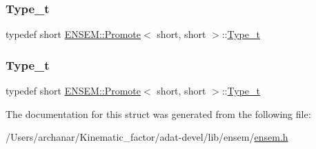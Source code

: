 \mbox{\label{structENSEM_1_1Promote_3_01short_00_01short_01_4_a6b4eee8b5b19e8dd07645327f1e73377}} 
\subsubsection{\texorpdfstring{Type\_t}{Type\_t}\hspace{0.1cm}{\footnotesize\ttfamily [2/3]}}
{\footnotesize\ttfamily typedef short \mbox{\hyperlink{structENSEM_1_1Promote}{E\+N\+S\+E\+M\+::\+Promote}}$<$ short, short $>$\+::\mbox{\hyperlink{structENSEM_1_1Promote_3_01short_00_01short_01_4_a6b4eee8b5b19e8dd07645327f1e73377}{Type\+\_\+t}}}

\mbox{\label{structENSEM_1_1Promote_3_01short_00_01short_01_4_a6b4eee8b5b19e8dd07645327f1e73377}} 
\subsubsection{\texorpdfstring{Type\_t}{Type\_t}\hspace{0.1cm}{\footnotesize\ttfamily [3/3]}}
{\footnotesize\ttfamily typedef short \mbox{\hyperlink{structENSEM_1_1Promote}{E\+N\+S\+E\+M\+::\+Promote}}$<$ short, short $>$\+::\mbox{\hyperlink{structENSEM_1_1Promote_3_01short_00_01short_01_4_a6b4eee8b5b19e8dd07645327f1e73377}{Type\+\_\+t}}}



The documentation for this struct was generated from the following file\+:\begin{DoxyCompactItemize}
\item 
/\+Users/archanar/\+Kinematic\+\_\+factor/adat-\/devel/lib/ensem/\mbox{\hyperlink{adat-devel_2lib_2ensem_2ensem_8h}{ensem.\+h}}\end{DoxyCompactItemize}

